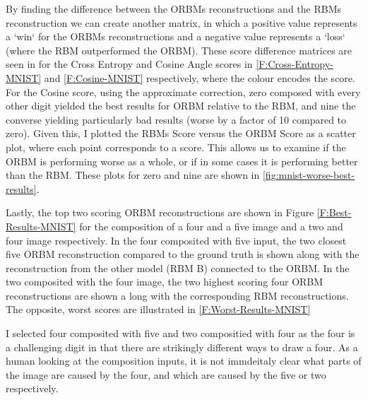   By finding the difference between the ORBMs reconstructions and the RBMs reconstruction we can create another matrix, in which a positive value represents a `win` for the ORBMs reconstructions and a negative value represents a `loss` (where the RBM outperformed the ORBM). These score difference matrices are seen in for the Cross Entropy and Cosine Angle scores in \ref{F:Cross-Entropy-MNIST} and \ref{F:Cosine-MNIST} respectively, where the colour encodes the score. For the Cosine score,  using the approximate correction, zero composed with every other digit yielded the best results for ORBM relative to the RBM, and nine the converse yielding particularly bad results (worse by a factor of 10 compared to zero). Given this, I plotted the RBMs Score versus the ORBM Score as a scatter plot, where each point corresponds to a score. This allows us to examine if the ORBM is performing worse as a whole, or if in some cases it is performing better than the RBM. These plots for zero and nine are shown in \ref{fig:mnist-worse-best-results}.
  
  Lastly, the top two scoring ORBM reconstructions are shown in Figure \ref{F:Best-Results-MNIST} for the composition of a four and a five image and a two and four image respectively. In the four composited with five input, the two closest five ORBM reconstruction compared to the ground truth is shown along with the reconstruction from the other model (RBM B) connected to the ORBM.
  In the two composited with the four image, the two highest scoring four ORBM reconstructions are shown a long with the corresponding RBM reconstructions.
  The opposite, worst scores are illustrated in \ref{F:Worst-Results-MNIST}

  I selected four composited with five and two compositied with four as the four is a challenging digit in that there are strikingly different ways to draw a four. As a human looking at the composition inputs, it is not immdeitaly clear what parts of the image are caused by the four, and which are caused by the five or two respectively.


